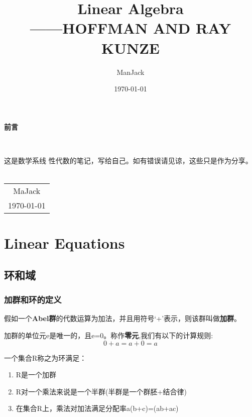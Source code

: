 \documentclass[11pt, a4paper, oneside,UTF8]{ctexbook}
\title{{\Huge{\textbf{Linear Algebra}}}\\------HOFFMAN AND RAY KUNZE}
\author{ManJack}
\date{\today}
\newtheorem[M]{theorem}{Theorem}[section]
\newtheorem[M]{lemma}[theorem]{Lemma}
\newtheorem[M]{proposition}[theorem]{Proposition}
\newtheorem[M]{corollary}[theorem]{Corollary}
\newtheorem[M]{definition}{Definition}[section]
\newtheorem[M]{example}{Example}[section]
\newtheorem[M]{remark}{Remark}[section]
\begin{document}
\maketitle

\setcounter{page}{1}
\newpage
\begin{center}
	\Huge\textbf{前言}
\end{center}~\

这是数学系线      性代数的笔记，写给自己。如有错误请见谅，这些只是作为分享。
~
\begin{flushright}
	\begin{tabular}{c}
		MaJack \\
		\today
	\end{tabular}
\end{flushright}

\newpage
{}
\setcounter{page}{1}

\tableofcontents
\newpage
\setcounter{page}{1}
\chapter{Linear Equations}
\section{环和域}
\subsection{加群和环的定义}
\begin{definition}[\textbf{加群}]
	假如一个\textbf{Abel群}的代数运算为加法，并且用符号‘+’表示，则该群叫做\textbf{加群}。

\end{definition}

\begin{remark}
	加群的单位元e是唯一的，且e=0。称作\textbf{零元},我们有以下的计算规则:
	\[
		0+a=a+0=a
	\]
\end{remark}

\begin{definition}[\textbf{环}]
	一个集合R称之为环满足：
	\begin{enumerate}
		\item R是一个加群
		\item R对一个乘法来说是一个半群(半群是一个群胚+结合律)
		\item 在集合R上，乘法对加法满足分配率a(b+c)=(ab+ac)
	\end{enumerate}
\end{definition}
\end{document}
